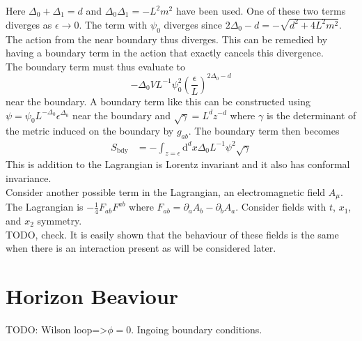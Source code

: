 \documentclass[12pt]{report}
\renewcommand{\d}{\ensuremath{\mathrm{d}}}
\begin{document}
Here $\Delta_0+\Delta_1=d$ and $\Delta_0\Delta_1=-L^2m^2$ have been used. One of these two terms diverges as $\epsilon\rightarrow0$. The term with $\psi_0$ diverges since $2\Delta_0-d=-\sqrt{d^2+4L^2m^2}$. The action from the near boundary thus diverges. This can be remedied by having a boundary term in the action that exactly cancels this divergence.\\
The boundary term must thus evaluate to
\begin{equation}
-\Delta_0VL^{-1}\psi_0^2\left(\frac{\epsilon}{L}\right)^{2\Delta_0-d}
\end{equation}
near the boundary. A boundary term like this can be constructed using $\psi=\psi_0L^{-\Delta_0}\epsilon^{\Delta_0}$ near the boundary and $\sqrt{\gamma}=L^dz^{-d}$ where $\gamma$ is the determinant of the metric induced on the boundary by $g_{ab}$.
The boundary term then becomes
\begin{equation}
\begin{split}
 S_{\mathrm{bdy}}&=-\int_{z=\epsilon}\d^dx\Delta_0L^{-1}\psi^2\sqrt{\gamma}
\label{Sbdy}
\end{split}
\end{equation}
This is addition to the Lagrangian is Lorentz invariant and it also has conformal invariance.
\\
Consider another possible term in the Lagrangian, an electromagnetic field $A_\mu$. The Lagrangian is $-\frac{1}{4}F_{ab}F^{ab}$ where $F_{ab}=\partial_aA_b-\partial_bA_a$. Consider fields with $t$, $x_1$, and $x_2$ symmetry.
\\
TODO, check. It is easily shown that the behaviour of these fields is the same when there is an interaction present as will be considered later.
\section{Horizon Beaviour}
TODO: Wilson loop=>$\phi=0$. Ingoing boundary conditions.
\end{document}
